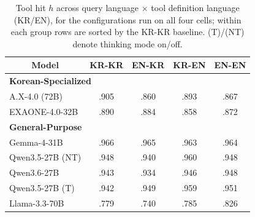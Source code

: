 \begin{table}[t]
\centering
\footnotesize
\caption{Tool hit $h$ across query language $\times$ tool definition language (KR/EN), for the configurations run on all four cells; within each group rows are sorted by the KR-KR baseline. (T)/(NT) denote thinking mode on/off.}
\label{tab:2x2_ablation}
\begin{tabular}{lcccc}
\toprule
\multicolumn{1}{c}{\textbf{Model}} & \textbf{KR-KR} & \textbf{EN-KR} & \textbf{KR-EN} & \textbf{EN-EN} \\
\midrule
\multicolumn{5}{l}{\textbf{Korean-Specialized}} \\
\addlinespace[2pt]
A.X-4.0 (72B) & .905 & .860 & .893 & .867 \\
EXAONE-4.0-32B & .890 & .884 & .858 & .872 \\
\midrule
\multicolumn{5}{l}{\textbf{General-Purpose}} \\
\addlinespace[2pt]
Gemma-4-31B & .966 & .965 & .963 & .964 \\
Qwen3.5-27B (NT) & .948 & .940 & .960 & .948 \\
Qwen3.6-27B & .943 & .934 & .946 & .948 \\
Qwen3.5-27B (T) & .942 & .949 & .959 & .951 \\
Llama-3.3-70B & .779 & .740 & .785 & .826 \\
\bottomrule
\end{tabular}
\end{table}
